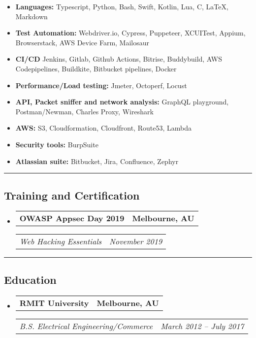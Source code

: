 \documentclass[11pt,letterpaper]{article}
\makeatletter
\newcommand{\headerrow}[2]
{\begin{tabular*}{\linewidth}{l@{\extracolsep{\fill}}r}
#1 &
#2 \\
\end{tabular*}}
\newcommand{\CPP}
{C\nolinebreak[4]\hspace{-.05em}\raisebox{.22ex}{\footnotesize\bf ++}}
\makeatother
\begin{document}
\begin{itemize}[leftmargin=1em,noitemsep]
	\item \textbf{Languages:}
	      Typescript, Python, Bash, Swift, Kotlin, Lua, \CPP, \LaTeX, Markdown
	\item \textbf{Test Automation:}
	    Webdriver.io, Cypress, Puppeteer, XCUITest, Appium, Browserstack, AWS Device Farm, Mailosaur
	\item \textbf{CI/CD} Jenkins, Gitlab, Github Actions, Bitrise, Buddybuild, AWS Codepipelines, Buildkite, Bitbucket pipelines, Docker
	\item \textbf{Performance/Load testing:} Jmeter, Octoperf, Locust 
    \item \textbf{API, Packet sniffer and network analysis:} GraphQL playground, Postman/Newman, Charles  Proxy, Wireshark
    \item \textbf{AWS:} S3, Cloudformation, Cloudfront, Route53, Lambda 
	\item \textbf{Security tools:} BurpSuite
    \item \textbf{Atlassian suite:} Bitbucket, Jira, Confluence, Zephyr
\end{itemize}

\hrule
\vspace{-1em}
\subsection*{\Large Training and Certification}

\begin{itemize}[leftmargin=1em]
	\parskip=0.1em
		
	\item
	      \headerrow
	      {\textbf{OWASP Appsec Day 2019}}
	      {\textbf{Melbourne, AU}}
	      \headerrow
	      {\emph{Web Hacking Essentials}}
	      {\emph{November 2019}}
	      	      
\end{itemize}

\hrule
\vspace{-1em}
\subsection*{\Large Education}

\begin{itemize}[leftmargin=1em]
	\parskip=0.1em
		
	\item
	      \headerrow
	      {\textbf{RMIT University}}
	      {\textbf{Melbourne, AU}}
	      \headerrow
	      {\emph{B.S. Electrical Engineering/Commerce}}
	      {\emph{March 2012 -- July 2017}}
	      	      
\end{itemize}
\end{document}
